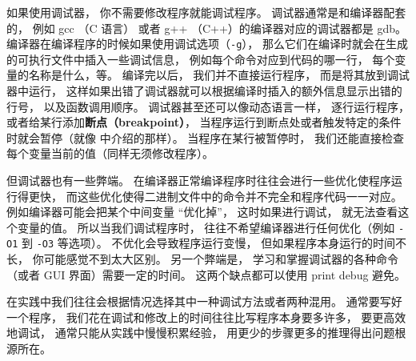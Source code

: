 如果使用调试器， 你不需要修改程序就能调试程序。 调试器通常是和编译器配套的， 例如 gcc （C 语言） 或者 g++ （C++）的编译器对应的调试器都是 gdb。 编译器在编译程序的时候如果使用调试选项（\verb|-g|）， 那么它们在编译时就会在生成的可执行文件中插入一些调试信息， 例如每个命令对应到代码的哪一行， 每个变量的名称是什么，等。 编译完以后， 我们并不直接运行程序， 而是将其放到调试器中运行， 这样如果出错了调试器就可以根据编译时插入的额外信息显示出错的行号， 以及函数调用顺序。 调试器甚至还可以像动态语言一样， 逐行运行程序， 或者给某行添加\textbf{断点（breakpoint）}， 当程序运行到断点处或者触发特定的条件时就会暂停（就像  中介绍的那样）。 当程序在某行被暂停时， 我们还能直接检查每个变量当前的值（同样无须修改程序）。

但调试器也有一些弊端。 在编译器正常编译程序时往往会进行一些优化使程序运行得更快， 而这些优化使得二进制文件中的命令并不完全和程序代码一一对应。 例如编译器可能会把某个中间变量 “优化掉”， 这时如果进行调试， 就无法查看这个变量的值。 所以当我们调试程序时， 往往不希望编译器进行任何优化（例如 \verb|-O1| 到 \verb|-O3| 等选项）。 不优化会导致程序运行变慢， 但如果程序本身运行的时间不长， 你可能感觉不到太大区别。 另一个弊端是， 学习和掌握调试器的各种命令（或者 GUI 界面）需要一定的时间。 这两个缺点都可以使用 print debug 避免。

在实践中我们往往会根据情况选择其中一种调试方法或者两种混用。 通常要写好一个程序， 我们花在调试和修改上的时间往往比写程序本身要多许多， 要更高效地调试， 通常只能从实践中慢慢积累经验， 用更少的步骤更多的推理得出问题根源所在。


